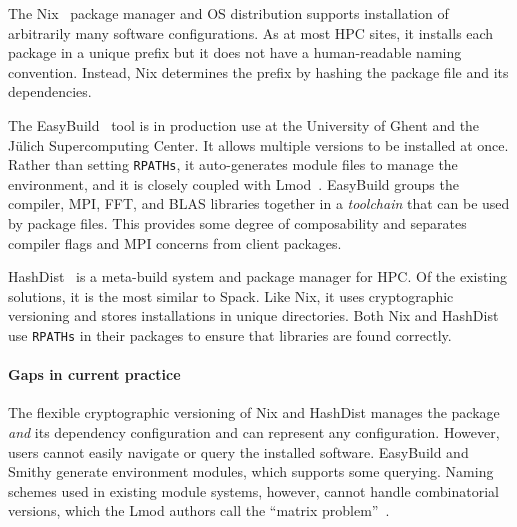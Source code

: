 The Nix~\cite{dolstra+:icfp08,dolstra+:lisa04} package manager and OS
distribution supports installation of arbitrarily many software
configurations.  As at most HPC sites, it installs each package
in a unique prefix but it does not have a human-readable naming
convention.  Instead, Nix determines the prefix by hashing the package
file and its dependencies.

The EasyBuild~\cite{hoste+:pyhpc12} tool is in production use at
the University of Ghent and the J\"ulich Supercomputing Center.
It allows multiple versions to be installed at once.  Rather
than setting {\tt RPATHs}, it auto-generates module files
to manage the environment, and it is closely coupled with
Lmod~\cite{geimer+:hust14}.  EasyBuild groups the compiler, MPI, FFT, and
BLAS libraries together in a {\it toolchain} that can be used by
package files. This provides some degree of composability and
separates compiler flags and MPI concerns from client packages.

HashDist~\cite{hashdist} is a meta-build system and package manager
for HPC.  Of the existing solutions, it is the most similar to Spack.
Like Nix, it uses cryptographic versioning and stores installations in
unique directories.
%
Both Nix and HashDist use {\tt RPATHs} in their packages to ensure that
libraries are found correctly.

\paragraph{Gaps in current practice}
The flexible cryptographic versioning of Nix and HashDist manages
the package {\it and} its dependency configuration and can represent any
configuration. However, users cannot easily navigate or query the installed
software.
%
EasyBuild and Smithy generate environment modules, which supports some
querying. Naming schemes used in existing module systems, however, cannot
handle combinatorial versions, which the Lmod authors call the
``matrix problem''~\cite{mclay:lmod-tutorial}.



